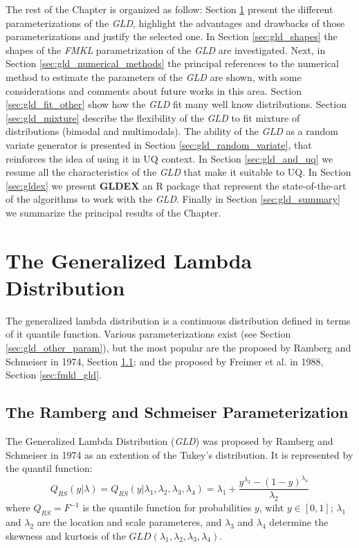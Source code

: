 The rest of the Chapter is organized as follow: Section \ref{sec:parameterizations} present the different parameterizations of the \textit{GLD}, highlight the advantages and drawbacks of those parameterizations and justify the selected one. In Section \ref{sec:gld_shapes} the shapes of the \textit{FMKL} parametrization of the \textit{GLD} are investigated. Next, in Section \ref{sec:gld_numerical_methods} the principal references to the numerical method to estimate the parameters of the \textit{GLD} are shown, with some considerations and comments about future works in this area. Section \ref{sec:gld_fit_other} show how the \textit{GLD} fit many well know distributions. Section \ref{sec:gld_mixture} describe the flexibility of the \textit{GLD} to fit mixture of distributions (bimodal and multimodals). The ability of the \textit{GLD} as a random variate generator is presented in Section \ref{sec:gld_random_variate}, that reinforces the idea of using it in UQ context. In Section \ref{sec:gld_and_uq} we resume all the characteristics of the \textit{GLD} that make it suitable to UQ. In Section \ref{sec:gldex} we present \textbf{GLDEX} an R package that represent the state-of-the-art of the algorithms to work with the \textit{GLD}. Finally in Section \ref{sec:gld_summary} we summarize the principal results of the Chapter.

\section{The Generalized Lambda Distribution}\label{sec:parameterizations}

The generalized lambda distribution is a continuous distribution defined in terms of it quantile function. Various parameterizations exist (see Section \ref{sec:gld_other_param}), but the most popular are the proposed by Ramberg and Schmeiser in 1974, Section \ref{sec:rs_gld}; and the proposed by Freimer et al. in 1988, Section \ref{sec:fmkl_gld}.

\subsection{The Ramberg and Schmeiser Parameterization}\label{sec:rs_gld}
The Generalized Lambda Distribution (\textit{GLD}) was proposed by Ramberg and Schmeiser in 1974 as an extention of the Tukey's distribution. It is represented by the quantil function:
\begin{equation}\label{eq:rs_param}
Q_{RS}(y|\lambda)=Q_{RS}(y|\lambda_{1}, \lambda_{2}, \lambda_{3}, \lambda_{4})=\lambda_{1}+\frac{y^{\lambda_{3}}-(1-y)^{\lambda_{4}}}{\lambda_{2}}
\end{equation}
where $Q_{RS}=F^{-1}$ is the quantile function for probabilities $y$, wiht $y\in[0,1]$; $\lambda_{1}$ and $\lambda_{2}$ are the location and scale parameteres, and $\lambda_{3}$ and $\lambda_{4}$ determine the skewness and kurtosis of the $GLD(\lambda_{1}, \lambda_{2}, \lambda_{3}, \lambda_{4})$.

